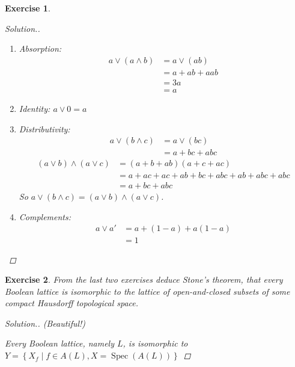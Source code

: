 \documentclass{article}
\theoremstyle{breakstyle}
\newtheorem{exercise}{Exercise}
\newenvironment{solution}
  {\begin{proof}[Solution.]\renewcommand{\qedsymbol}{}}
  {\end{proof}}
\DeclareMathOperator{\spec}{Spec}
\begin{document}
\begin{exercise}
\begin{solution}
\begin{enumerate}[label=({\alph*})]
\begin{enumerate}[label=({\roman*})]
                    \item Absorption:
                        \begin{align*}
                            a\vee (a\wedge b)&= a\vee (ab) \\
                            &= a+ab+aab \\
                            &= 3a \\
                            &= a
                        \end{align*}
                    \item Identity:
                        $a\vee 0=a$ 
                    \item Distributivity:
                        \begin{align*}
                            a\vee (b\wedge c)&= a\vee (bc) \\
                            &= a+bc+abc
                        \end{align*}
                        \begin{align*}
                            (a\vee b)\wedge (a\vee c)&= (a+b+ab)(a+c+ac) \\
                            &= a+ac+ac+ab+bc+abc+ab+abc+abc \\
                            &= a+bc+abc
                        \end{align*}
                        So $a\vee (b\wedge c)=(a\vee b)\wedge (a\vee c)$.
                    \item Complements:
                        \begin{align*}
                            a\vee a'&= a+(1-a)+a(1-a) \\
                            &= 1
                        \end{align*}
                \end{enumerate}
        \end{enumerate}
\end{solution}
\end{exercise}

\begin{exercise}
From the last two exercises deduce Stone's theorem, that every Boolean lattice is isomorphic to the lattice of open-and-closed subsets of some compact Hausdorff topological space.

\begin{solution}
    \emph{(Beautiful!)}

        Every Boolean lattice, namely $L$, is isomorphic to $Y=\left\{ X_{f}\mid f\in A(L),X=\spec(A(L)) \right\} $
\end{solution}
\end{exercise}
\end{document}
